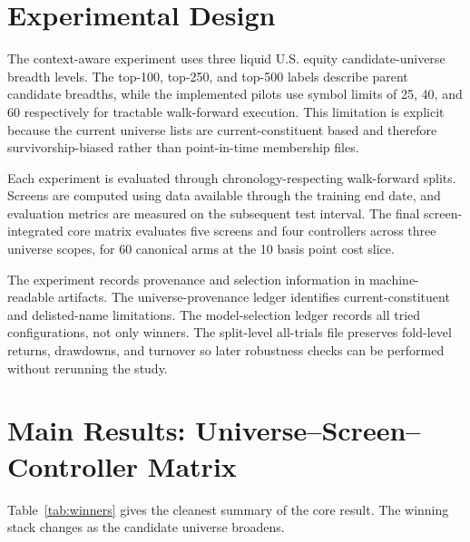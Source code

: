\documentclass[11pt,a4paper]{article}
\begin{document}
\section{Experimental Design}
The context-aware experiment uses three liquid U.S. equity candidate-universe breadth levels. The top-100, top-250, and top-500 labels describe parent candidate breadths, while the implemented pilots use symbol limits of 25, 40, and 60 respectively for tractable walk-forward execution. This limitation is explicit because the current universe lists are current-constituent based and therefore survivorship-biased rather than point-in-time membership files.

Each experiment is evaluated through chronology-respecting walk-forward splits. Screens are computed using data available through the training end date, and evaluation metrics are measured on the subsequent test interval. The final screen-integrated core matrix evaluates five screens and four controllers across three universe scopes, for 60 canonical arms at the 10 basis point cost slice.

The experiment records provenance and selection information in machine-readable artifacts. The universe-provenance ledger identifies current-constituent and delisted-name limitations. The model-selection ledger records all tried configurations, not only winners. The split-level all-trials file preserves fold-level returns, drawdowns, and turnover so later robustness checks can be performed without rerunning the study.

\section{Main Results: Universe--Screen--Controller Matrix}
Table~\ref{tab:winners} gives the cleanest summary of the core result. The winning stack changes as the candidate universe broadens.
\begin{table}[H]
\centering
\caption{Best screen/controller stack by candidate-universe breadth. Metrics are mean walk-forward values at the 10 basis point transaction-cost slice.}
\label{tab:winners}
\small
{}
\end{table}
\end{document}

